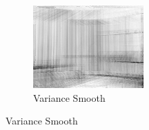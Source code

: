 \documentclass[10pt]{report}
\begin{document}
\begin{figure}[H]
\begin{subfigure}[b]{0.3\textwidth}
                \label{fig:tiger}
        \end{subfigure}
        \begin{subfigure}[b]{0.3\textwidth}
                \centering
                \includegraphics[width=\textwidth]{D0-variance.png}
                \caption{Variance Smooth}
                \label{fig:mouse}
        \end{subfigure}
        

\end{figure}
\end{document}
